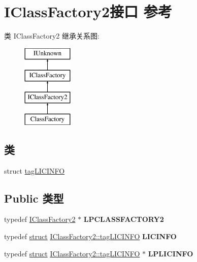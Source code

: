\hypertarget{interface_i_class_factory2}{}\section{I\+Class\+Factory2接口 参考}
\label{interface_i_class_factory2}
类 I\+Class\+Factory2 继承关系图\+:\begin{figure}[H]
\begin{center}
\leavevmode
\includegraphics[height=4.000000cm]{interface_i_class_factory2}
\end{center}
\end{figure}
\subsection*{类}
\begin{DoxyCompactItemize}
\item 
struct \hyperlink{struct_i_class_factory2_1_1tag_l_i_c_i_n_f_o}{tag\+L\+I\+C\+I\+N\+FO}
\end{DoxyCompactItemize}
\subsection*{Public 类型}
\begin{DoxyCompactItemize}
\item 
\mbox{\label{interface_i_class_factory2_af527ef4caf5c0a095c8509945bd455de}} 
typedef \hyperlink{interface_i_class_factory2}{I\+Class\+Factory2} $\ast$ {\bfseries L\+P\+C\+L\+A\+S\+S\+F\+A\+C\+T\+O\+R\+Y2}
\item 
\mbox{\label{interface_i_class_factory2_aec27fe374e2b29d642f14920fb876517}} 
typedef \hyperlink{interfacestruct}{struct} \hyperlink{struct_i_class_factory2_1_1tag_l_i_c_i_n_f_o}{I\+Class\+Factory2\+::tag\+L\+I\+C\+I\+N\+FO} {\bfseries L\+I\+C\+I\+N\+FO}
\item 
\mbox{\label{interface_i_class_factory2_a024148661c167f9aaeed16758a44d69e}} 
typedef \hyperlink{interfacestruct}{struct} \hyperlink{struct_i_class_factory2_1_1tag_l_i_c_i_n_f_o}{I\+Class\+Factory2\+::tag\+L\+I\+C\+I\+N\+FO} $\ast$ {\bfseries L\+P\+L\+I\+C\+I\+N\+FO}
\end{DoxyCompactItemize}

